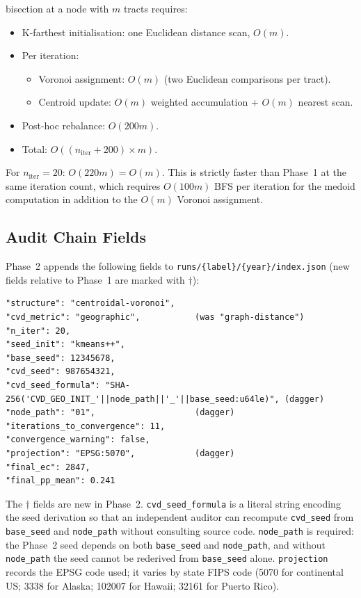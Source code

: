 \begin{proposition}
\label{prop:geo-runtime}
\cvdgeo{} bisection at a node with $m$ tracts requires:
\begin{itemize}
\item K-farthest initialisation: one Euclidean distance scan, $O(m)$.
\item Per iteration:
  \begin{itemize}
  \item Voronoi assignment: $O(m)$ (two Euclidean comparisons per tract).
  \item Centroid update: $O(m)$ weighted accumulation + $O(m)$ nearest scan.
  \end{itemize}
\item Post-hoc rebalance: $O(200 m)$.
\item Total: $O((n_{\mathrm{iter}} + 200) \times m)$.
\end{itemize}
For $n_{\mathrm{iter}} = 20$: $O(220m) = O(m)$.
This is strictly faster than Phase~1 at the same iteration count, which
requires $O(100m)$ BFS per iteration for the medoid computation in addition to
the $O(m)$ Voronoi assignment.
\end{proposition}

\subsection{Audit Chain Fields}
\label{subsec:audit}

Phase~2 appends the following fields to
\texttt{runs/\{label\}/\{year\}/index.json}
(new fields relative to Phase~1 are marked with $\dagger$):

\begin{verbatim}
"structure": "centroidal-voronoi",
"cvd_metric": "geographic",           (was "graph-distance")
"n_iter": 20,
"seed_init": "kmeans++",
"base_seed": 12345678,
"cvd_seed": 987654321,
"cvd_seed_formula": "SHA-256('CVD_GEO_INIT_'||node_path||'_'||base_seed:u64le)", (dagger)
"node_path": "01",                    (dagger)
"iterations_to_convergence": 11,
"convergence_warning": false,
"projection": "EPSG:5070",            (dagger)
"final_ec": 2847,
"final_pp_mean": 0.241
\end{verbatim}

The $\dagger$ fields are new in Phase~2.
\texttt{cvd\_seed\_formula} is a literal string encoding the seed derivation
so that an independent auditor can recompute \texttt{cvd\_seed} from
\texttt{base\_seed} and \texttt{node\_path} without consulting source code.
\texttt{node\_path} is required: the Phase~2 seed depends on both \texttt{base\_seed}
and \texttt{node\_path}, and without \texttt{node\_path} the seed cannot be
rederived from \texttt{base\_seed} alone.
\texttt{projection} records the EPSG code used; it varies by state FIPS code
(5070 for continental US; 3338 for Alaska; 102007 for Hawaii; 32161 for Puerto Rico).
